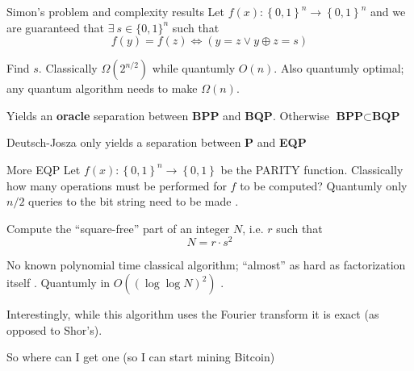 \documentclass{beamer}
\begin{document}
\begin{frame}{Simon's problem and complexity results}
Let $f\left(x\right):\left\{ 0,1\right\} ^{n}\to\left\{ 0,1\right\}^n$ and we are guaranteed that $\exists ~ s\in \{0,1\}^n$ such that 
\[
  f\left(y\right)=f\left(z\right) \iff \left(y=z \vee y\oplus z = s\right)
\]

Find $s$. Classically $\Omega\left(2^{n/2}\right)$ while quantumly $O\left(n\right)$. Also quantumly optimal; any quantum algorithm
needs to make $\Omega\left(n\right)$. 

\vspace{\baselineskip}

Yields an \textbf{oracle} separation between \textbf{BPP} and \textbf{BQP}. Otherwise $\textbf{BPP}\subset \textbf{BQP}$

\vspace{\baselineskip}



Deutsch-Josza only yields a separation between \textbf{P} and \textbf{EQP}

\end{frame}
\begin{frame}{More EQP}
Let $f\left(x\right):\left\{ 0,1\right\} ^{n}\to\left\{ 0,1\right\}$ be the PARITY function. Classically how many operations must be performed for $f$ to be computed?
Quantumly only $n/2$ queries to the bit string need to be made \cite{de2002quantum}.  

\vspace{\baselineskip}

Compute the ``square-free'' part of an integer $N$, i.e. $r$ such that
\[
N=r\cdot s^2
\]

No known polynomial time classical algorithm; ``almost'' as hard as factorization itself \cite{Okamoto98anew}. Quantumly in $O\left(\left(\log \log N\right)^2\right)$ \cite{li2012efficient}. 

\vspace{\baselineskip}


Interestingly, while this algorithm uses the Fourier transform it is exact (as opposed to Shor's).

\end{frame}

\begin{frame}{\textbf{}}
\begin{center} \Huge So where can I get one (so I can start mining Bitcoin)\end{center}
\end{frame}
\end{document}
